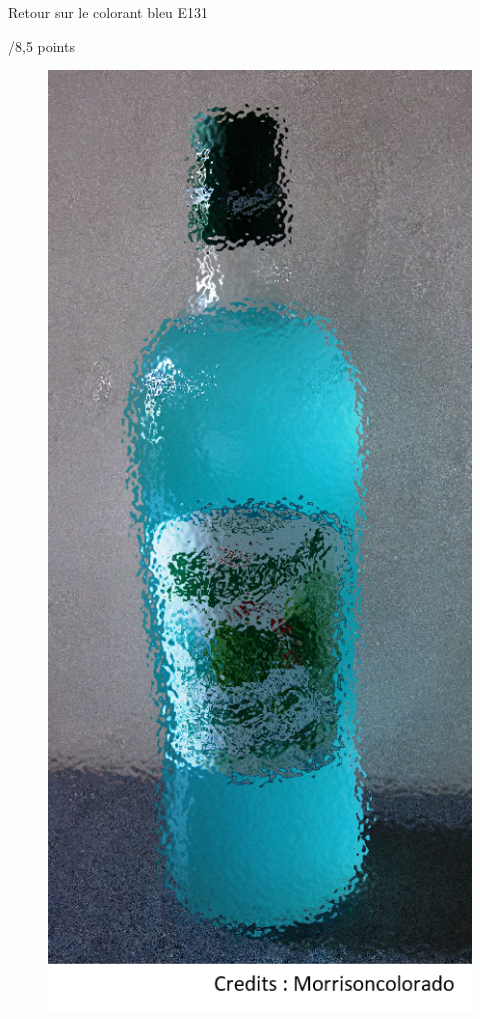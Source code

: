 \begin{doc}{Retour sur le colorant bleu E131 \begin{Large}
    /8,5 points
\end{Large}}
\begin{figure}
\vspace{-1cm}
    \centering
      \includegraphics[scale=0.35]{Images/Sirop_menthe.png}

\end{figure}
\end{doc}

